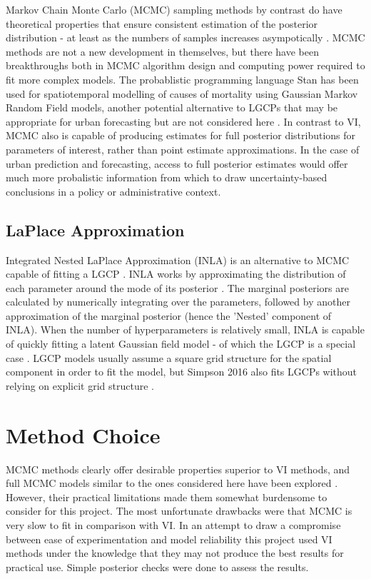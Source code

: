Markov Chain Monte Carlo (MCMC) sampling methods by contrast do have theoretical properties that ensure consistent estimation of the posterior distribution - at least  as the numbers of samples increases asympotically \cite{teng_2017}. MCMC methods are not a new development in themselves, but there have been breakthroughs both in MCMC algorithm design and computing power required to fit more complex models. The probablistic programming language Stan has been used for spatiotemporal modelling of causes of mortality using Gaussian Markov Random Field models, another potential alternative to LGCPs that may be appropriate for urban forecasting but are not considered here \cite{stan} \cite{foreman_2017}. In contrast to VI, MCMC also is capable of producing estimates for full posterior distributions for parameters of interest, rather than point estimate approximations. In the case of urban prediction and forecasting, access to full posterior estimates would offer much more probalistic information from which to draw uncertainty-based conclusions in a policy or administrative context.

\subsection{LaPlace Approximation}

Integrated Nested LaPlace Approximation (INLA) is an alternative to MCMC capable of fitting a LGCP \cite{illian_toolbox}. INLA works by approximating the distribution of each parameter around the mode of its posterior \cite{lindgren2015bayesian}. The marginal posteriors are calculated by numerically integrating over the parameters, followed by another approximation of the marginal posterior (hence the 'Nested' component of INLA). When the number of hyperparameters is relatively small, INLA is capable of quickly fitting a latent Gaussian field model - of which the LGCP is a special case \cite{rue2009approximate}. LGCP models usually assume a square grid structure for the spatial component in order to fit the model, but Simpson 2016 also fits LGCPs without relying on explicit grid structure \cite{simpson2016going}.


\section{Method Choice}

MCMC methods clearly offer desirable properties superior to VI methods, and full MCMC models similar to the ones considered here have been explored \cite{Flaxman2015FastHG}. However, their practical limitations made them somewhat burdensome to consider for this project. The most unfortunate drawbacks were that MCMC is very slow to fit in comparison with VI. In an attempt to draw a compromise between ease of experimentation and model reliability this project used VI methods under the knowledge that they may not produce the best results for practical use. Simple posterior checks were done to assess the results.
